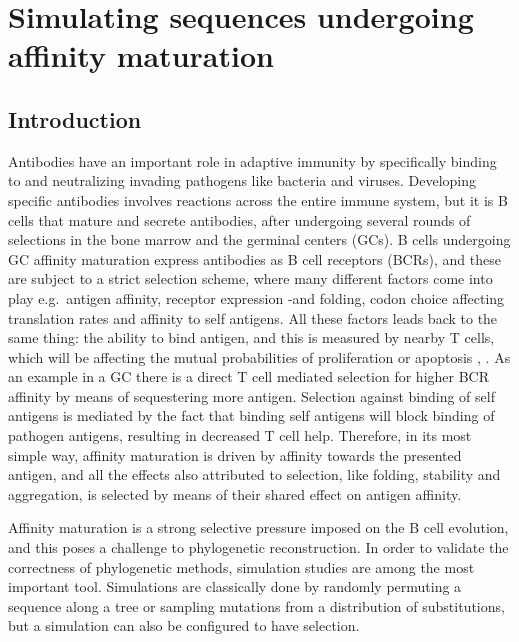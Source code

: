 \chapter{Simulating sequences undergoing affinity maturation}

\section{Introduction}
Antibodies have an important role in adaptive immunity by specifically binding to and neutralizing invading pathogens like bacteria and viruses.
Developing specific antibodies involves reactions across the entire immune system, but it is B cells that mature and secrete antibodies, after undergoing several rounds of selections in the bone marrow and the germinal centers (GCs).
B cells undergoing GC affinity maturation express antibodies as B cell receptors (BCRs), and these are subject to a strict selection scheme, where many different factors come into play e.g.\ antigen affinity, receptor expression -and folding, codon choice affecting translation rates and affinity to self antigens.
All these factors leads back to the same thing: the ability to bind antigen, and this is measured by nearby T cells, which will be affecting the mutual probabilities of proliferation or apoptosis \cite{Bannard_Cyster_2017}, \cite{victora2012germinal}.
As an example in a GC there is a direct T cell mediated selection for higher BCR affinity by means of sequestering more antigen.
Selection against binding of self antigens is mediated by the fact that binding self antigens will block binding of pathogen antigens, resulting in decreased T cell help.
Therefore, in its most simple way, affinity maturation is driven by affinity towards the presented antigen, and all the effects also attributed to selection, like folding, stability and aggregation, is selected by means of their shared effect on antigen affinity.

Affinity maturation is a strong selective pressure imposed on the B cell evolution, and this poses a challenge to phylogenetic reconstruction.
In order to validate the correctness of phylogenetic methods, simulation studies are among the most important tool.
Simulations are classically done by randomly permuting a sequence along a tree or sampling mutations from a distribution of substitutions, but a simulation can also be configured to have selection.

